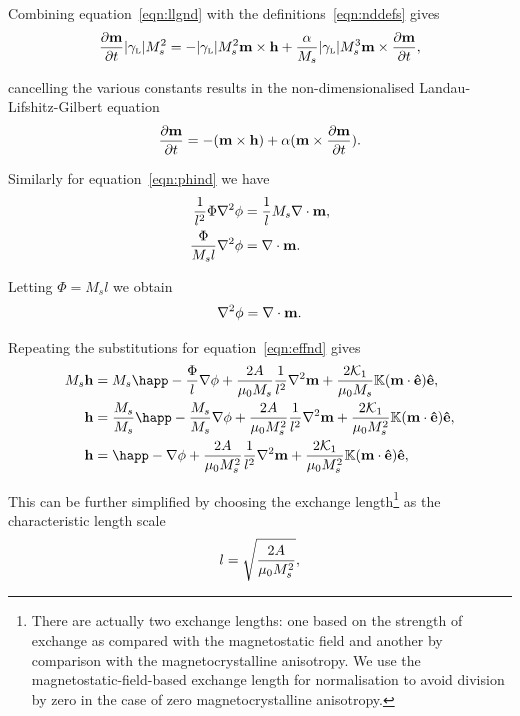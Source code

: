 Combining equation~\cref{eqn:llgnd} with the definitions~\cref{eqn:nddefs} gives
\begin{equation}
   \frac{\partial \mathbf{m}}{\partial t} {\left|{\gamma_{\text{\tiny{L}}}} \right|} M_s^2 =
  - {\left|{\gamma_{\text{\tiny{L}}}} \right|} M_s^2 \mathbf{m} \times \mathbf{h} + \frac{\alpha}{M_s} {\left|{\gamma_{\text{\tiny{L}}}} \right|} M_s^3 \mathbf{m} \times \frac{\partial \mathbf{m}}{\partial t},
\end{equation}

cancelling the various constants results in the non-dimensionalised Landau-Lifshitz-Gilbert equation
\begin{equation}
  \label{eq:53}
  \frac{\partial \mathbf{m}}{\partial t} = - (\mathbf{m} \times \mathbf{h}) + \alpha (\mathbf{m} \times \frac{\partial \mathbf{m}}{\partial t}).
\end{equation}

Similarly for equation~\cref{eqn:phind} we have
\begin{align*}
  \frac{1}{l^2} \Phi \nabla^{2} \phi &= \frac{1}{l} M_s \nabla \cdot \mathbf{m}, \\
  \frac{\Phi}{M_s l} \nabla^{2} \phi &= \nabla \cdot \mathbf{m}.
\end{align*}

Letting $\Phi = M_s l$ we obtain
\begin{equation}
  \label{eq:57}
  \nabla^2 \phi = \nabla \cdot \mathbf{m}.
\end{equation}

Repeating the substitutions for equation~\cref{eqn:effnd} gives
\begin{align*}
  M_s \hv &= M_s \happ - \frac{\Phi}{l} \nabla \phi + \frac{2 \Exchc }{\mu_0 M_s} \frac{1}{l^2} \lap \mv + \frac{2\kone}{\mu_0 M_s}  \nK (\mv \cdot \ev) \ev, \\
  \hv &= \frac{M_s}{M_s} \happ - \frac{M_s}{M_s} \nabla \phi + \frac{2 \Exchc}{\mu_0 M_s^2} \frac{1}{l^2} \lap \mv + \frac{2\kone}{\mu_0 M_s^2} \nK (\mv \cdot \ev) \ev, \\
  \hv &= \happ - \nabla \phi + \frac{2 \Exchc}{\mu_0 M_s^2} \frac{1}{l^2} \lap \mv + \frac{2\kone}{\mu_0 M_s^2} \nK (\mv \cdot \ev) \ev, \\
\end{align*}

This can be further simplified by choosing the exchange length\footnote{There are actually two exchange lengths: one based on the strength of exchange as compared with the magnetostatic field and another by comparison with the magnetocrystalline anisotropy. We use the magnetostatic-field-based exchange length for normalisation to avoid division by zero in the case of zero magnetocrystalline anisotropy.} as the characteristic length scale
\begin{equation}
  \label{eqn:l-normalisation}
  l = \sqrt{ \frac{2 A}{\mu_0 M_s^2} },
\end{equation}

